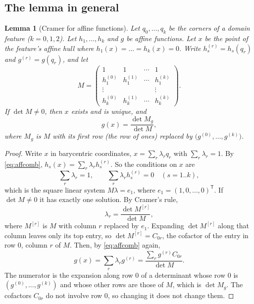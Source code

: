 \documentclass[11pt,a4paper]{article}
\newtheorem{lemma}{Lemma}
\theoremstyle{remark}
\begin{document}
\subsection{The lemma in general}

\begin{lemma}[Cramer for affine functions]\label{lem:cramer}
Let $q_0, \dots, q_k$ be the corners of a domain feature ($k = 0, 1, 2$). Let
$h_1, \dots, h_k$ and $g$ be affine functions. Let $x$ be the point of the feature's affine
hull where $h_1(x) = \dots = h_k(x) = 0$. Write $h_s^{(r)} = h_s(q_r)$ and $g^{(r)} = g(q_r)$,
and let
\[
  M = \begin{pmatrix}
    1 & 1 & \cdots & 1 \\
    h_1^{(0)} & h_1^{(1)} & \cdots & h_1^{(k)} \\
    \vdots & & & \vdots \\
    h_k^{(0)} & h_k^{(1)} & \cdots & h_k^{(k)}
  \end{pmatrix}.
\]
If $\det M \neq 0$, then $x$ exists and is unique, and
\[
  g(x) = \frac{\det M_g}{\det M},
\]
where $M_g$ is $M$ with its first row (the row of ones) replaced by
$\bigl(g^{(0)}, \dots, g^{(k)}\bigr)$.
\end{lemma}

\begin{proof}
Write $x$ in barycentric coordinates, $x = \sum_r \lambda_r q_r$ with $\sum_r \lambda_r = 1$. By
\eqref{eq:affcomb}, $h_s(x) = \sum_r \lambda_r h_s^{(r)}$. So the conditions on $x$ are
\[
  \textstyle\sum_r \lambda_r = 1, \qquad \sum_r \lambda_r h_s^{(r)} = 0 \quad (s = 1..k),
\]
which is the square linear system $M\lambda = e_1$, where $e_1 = (1, 0, \dots, 0)^\mathsf{T}$.
If $\det M \neq 0$ it has exactly one solution. By Cramer's rule,
\[
  \lambda_r = \frac{\det M^{[r]}}{\det M},
\]
where $M^{[r]}$ is $M$ with column $r$ replaced by $e_1$. Expanding $\det M^{[r]}$ along that
column leaves only its top entry, so $\det M^{[r]} = C_{0r}$, the cofactor of the entry in row 0,
column $r$ of $M$. Then, by \eqref{eq:affcomb} again,
\[
  g(x) = \sum_r \lambda_r g^{(r)} = \frac{\sum_r g^{(r)} C_{0r}}{\det M}.
\]
The numerator is the expansion along row 0 of a determinant whose row 0 is
$(g^{(0)}, \dots, g^{(k)})$ and whose other rows are those of $M$, which is $\det M_g$. The
cofactors $C_{0r}$ do not involve row 0, so changing it does not change them.
\end{proof}
\end{document}
